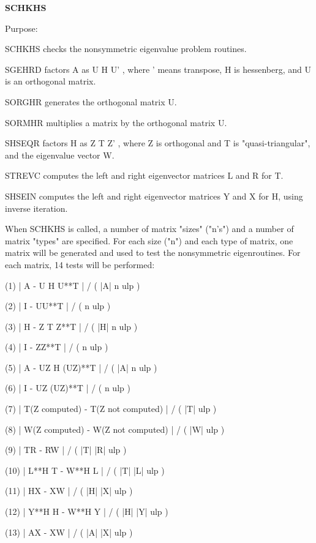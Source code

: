 {\bfseries S\+C\+H\+K\+H\+S} 

\begin{DoxyParagraph}{Purpose\+: }
\begin{DoxyVerb}    SCHKHS  checks the nonsymmetric eigenvalue problem routines.

            SGEHRD factors A as  U H U' , where ' means transpose,
            H is hessenberg, and U is an orthogonal matrix.

            SORGHR generates the orthogonal matrix U.

            SORMHR multiplies a matrix by the orthogonal matrix U.

            SHSEQR factors H as  Z T Z' , where Z is orthogonal and
            T is "quasi-triangular", and the eigenvalue vector W.

            STREVC computes the left and right eigenvector matrices
            L and R for T.

            SHSEIN computes the left and right eigenvector matrices
            Y and X for H, using inverse iteration.

    When SCHKHS is called, a number of matrix "sizes" ("n's") and a
    number of matrix "types" are specified.  For each size ("n")
    and each type of matrix, one matrix will be generated and used
    to test the nonsymmetric eigenroutines.  For each matrix, 14
    tests will be performed:

    (1)     | A - U H U**T | / ( |A| n ulp )

    (2)     | I - UU**T | / ( n ulp )

    (3)     | H - Z T Z**T | / ( |H| n ulp )

    (4)     | I - ZZ**T | / ( n ulp )

    (5)     | A - UZ H (UZ)**T | / ( |A| n ulp )

    (6)     | I - UZ (UZ)**T | / ( n ulp )

    (7)     | T(Z computed) - T(Z not computed) | / ( |T| ulp )

    (8)     | W(Z computed) - W(Z not computed) | / ( |W| ulp )

    (9)     | TR - RW | / ( |T| |R| ulp )

    (10)    | L**H T - W**H L | / ( |T| |L| ulp )

    (11)    | HX - XW | / ( |H| |X| ulp )

    (12)    | Y**H H - W**H Y | / ( |H| |Y| ulp )

    (13)    | AX - XW | / ( |A| |X| ulp )


\end{DoxyVerb}
\end{DoxyParagraph}

